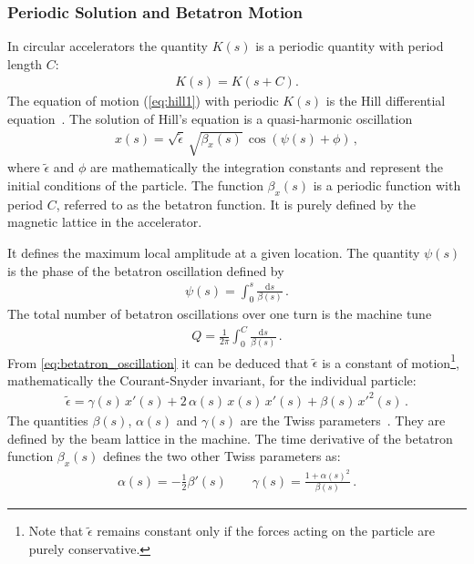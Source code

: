\subsubsection{Periodic Solution and Betatron Motion}
In circular accelerators the quantity $K(s)$ is a periodic quantity with period length $C$:
\begin{align}
K(s) = K(s+C) .
\end{align}
The equation of motion (\ref{eq:hill1}) with periodic $K(s)$ is the Hill differential equation~\cite{wiedemann1999particle}.
The solution of Hill's equation is a quasi-harmonic oscillation 
\begin{align}
x(s) = \sqrt{\tilde{\epsilon}} \, \sqrt{\beta_x(s)} \, \cos \left( \psi(s) + \phi \right) \, , \label{eq:betatron_oscillation}
\end{align}
where $\tilde{\epsilon}$ and $\phi$ are mathematically the integration constants and represent the initial conditions of the particle. The function $\beta_x(s)$ is a periodic function with period $C$, referred to as the betatron function. It is purely defined by the magnetic lattice in the accelerator. 

It defines the maximum local amplitude at a given location. The quantity $\psi(s)$ is the phase of the betatron oscillation defined by
\begin{align}
\psi(s) = \int_0^s \frac{\mathrm{d}s}{\beta(s)} \, .
\end{align}
The total number of betatron oscillations over one turn is the machine tune
%
\begin{align}
  Q = \frac{1}{2 \pi} \int_0^C \frac{\mathrm{d}s}{\beta(s)} \, .
\end{align}
%
%
From \eqref{eq:betatron_oscillation} it can be deduced that $\tilde{\epsilon}$ is a constant of motion\footnote{Note that $\tilde{\epsilon}$ remains constant only if the forces acting on the particle are purely conservative.}, mathematically the Courant-Snyder invariant, for the individual particle:
\begin{align}
\tilde{\epsilon} = \gamma(s) \, x'(s) + 2 \, \alpha(s) \, x(s) \, x'(s) + \beta(s) \, x'^2 (s) \, . \label{eq:parameric_ellipse}
\end{align}
The quantities $\beta(s)$, $\alpha(s)$ and $\gamma(s)$ are the Twiss parameters~\cite{wiedemann1999particle}. They are defined by the beam lattice in the machine. The time derivative of the betatron function $\beta_x(s)$ defines the two other Twiss parameters as:
\begin{align}
\alpha(s) = - \frac{1}{2} \beta'(s) \quad \quad \gamma(s) = \frac{1+\alpha(s)^2}{\beta(s)} \, .
\end{align}

